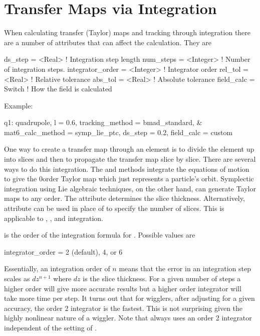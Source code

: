\section{Transfer Maps via Integration}
\label{s:integ}

When calculating transfer (Taylor) maps and tracking through integration
there are a number of attributes that can affect the calculation. They are
\begin{example}
  ds_step = <Real>              ! Integration step length
  num_steps = <Integer>         ! Number of integration steps.
  integrator_order = <Integer>  ! Integrator order
  rel_tol = <Real>              ! Relative tolerance
  abs_tol = <Real>              ! Absolute tolerance
  field_calc = Switch           ! How the field is calculated
\end{example}
Example:
\begin{example}
  q1: quadrupole, l = 0.6, tracking_method = bmad_standard, &
        mat6_calc_method = symp_lie_ptc, ds_step = 0.2, field_calc = custom
\end{example}

One way to create a transfer map through an element is to divide the
element up into slices and then to propagate the transfer map slice by
slice.  There are several ways to do this integration. The 
and  methods integrate the equations of motion to
give the 0\Th order Taylor map which just represents a particle's
orbit.  Symplectic integration using Lie
algebraic techniques, on the other hand, can generate Taylor maps to
any order.  The  attribute determines the slice thickness.
Alternatively,  attribute can be used in place of
 to specify the number of slices.
This is applicable to , , and
 integration.

 is the order of the integration formula for 
. Possible values are
\begin{example}
  integrator_order = 2 (default), 4, or 6
\end{example}
Essentially, an integration order of $n$ means that the error in an
integration step scales as $dz^{n+1}$ where $dz$ is the slice
thickness.  For a given number of steps a higher order will give more
accurate results but a higher order integrator will take more time per
step. It turns out that for wigglers, after adjusting 
for a given accuracy, the order 2 integrator is the fastest. This is
not surprising given the highly nonlinear nature of a wiggler. Note
that  always uses an order 2 integrator
independent of the setting of .

